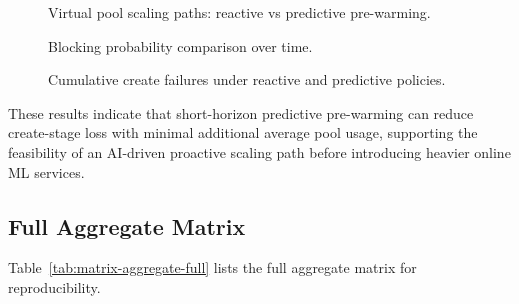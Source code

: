 \documentclass[12pt,a4paper]{report}
\newcommand{\PredictiveChartsDir}{../data/predictive-1776567787891/charts}
\begin{document}
\begin{figure}[H]
\centering

\caption{Virtual pool scaling paths: reactive vs predictive pre-warming.}
\label{fig:predictive-pool-compare}
\end{figure}

\begin{figure}[H]
\centering

\caption{Blocking probability comparison over time.}
\label{fig:predictive-blocking-compare}
\end{figure}

\begin{figure}[H]
\centering

\caption{Cumulative create failures under reactive and predictive policies.}
\label{fig:predictive-cumulative-failures}
\end{figure}

These results indicate that short-horizon predictive pre-warming can reduce create-stage loss with minimal additional average pool usage, supporting the feasibility of an AI-driven proactive scaling path before introducing heavier online ML services.

\subsection{Full Aggregate Matrix}
\label{subsec:full-matrix}
Table~\ref{tab:matrix-aggregate-full} lists the full aggregate matrix for reproducibility.
\end{document}
